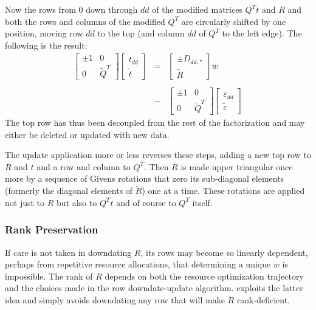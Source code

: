 Now the rows from 0 down through $dd$ of the modified matrices $Q^Tt$ and $R$ and both the rows and columns of the modified $Q^T$
are circularly shifted by one position, moving row $dd$ to the top (and column $dd$ of $Q^T$ to the left edge).
The following is the result:
\begin{displaymath}
\begin{array}{lll}
    \left[\begin{array}{cc}
      \pm1  &  0 \\
      0     &  \tilde{Q}^T
   \end{array}\right]
   \left[\begin{array}{c}
      t_{dd} \\
      \tilde{t}
   \end{array}\right]
   &=&
   \left[\begin{array}{c}
      \pm D_{dd,*} \\
      \tilde{R}
   \end{array}\right] w
   \\
   \\
   &-&
   \left[\begin{array}{cc}
      \pm1  &  0 \\
      0     &  \tilde{Q}^T
   \end{array}\right]
   \left[\begin{array}{c}
      \varepsilon_{dd} \\
      \tilde{\varepsilon}
   \end{array}\right]
\end{array}
\end{displaymath}
The top row has thus been decoupled from the rest of the factorization and may either be deleted or updated with new data.

The update application more or less reverses these steps, adding a new top row to $R$ and $t$ and a row and column to $Q^T$.
Then $R$ is made upper triangular once more by a sequence of Givens rotations that zero its sub-diagonal elements
(formerly the diagonal elements of $\tilde{R}$) one at a time.
These rotations are applied not just to $R$ but also to $Q^Tt$ and of course to $Q^T$ itself.

\subsubsection{Rank Preservation}

If care is not taken in downdating $R$, its rows may become so linearly dependent,
perhaps from repetitive resource allocations,
that determining a unique $w$ is impossible.
The rank of $R$ depends on both the resource optimization trajectory and the
choices made in the row downdate-update algorithm.
\pacora exploits the latter idea and simply avoids downdating any row that will make $R$ rank-deficient.

